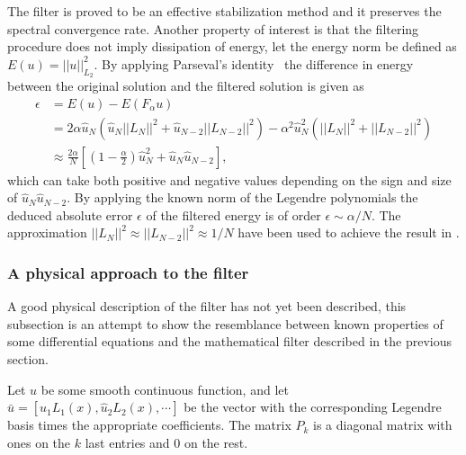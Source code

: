 The filter is proved to be an effective stabilization method and it preserves the 
spectral convergence rate. Another property of interest is that the filtering procedure 
does not imply dissipation of energy, let the energy norm be defined as $E(u) = ||u||_{L_2}^2$.  
By applying Parseval's identity~\cite{Young} the difference in energy between the original solution
and the filtered solution is given as 
\begin{align}
   \epsilon&=E(u) - E(F_{\alpha}u) \\
                &= 2\alpha\hat{u}_N(\hat{u}_N||L_N||^2+\hat{u}_{N-2}||L_{N-2}||^2)
    - \alpha^2\hat{u}^2_N(||L_N||^2+||L_{N-2}||^2)\\
    &\approx \frac{2\alpha}{N}\left[  (1-\frac{\alpha}{2})\hat{u}_N^2 + 
    \hat{u}_N\hat{u}_{N-2}\right],
    \label{eq:filterenergy}
\end{align}
which can take both positive and negative values depending on the sign and size of
$\hat{u}_N\hat{u}_{N-2}$. By applying the known norm of the Legendre polynomials 
the deduced absolute error $\epsilon$ of the filtered energy is of order 
$\epsilon\sim \alpha/N$. The approximation $||L_N||^2\approx||L_{N-2}||^2\approx 1/N$
have been used to achieve the result in .

\subsubsection{A physical approach to the filter}\label{physfilt}
A good physical description of the filter has not yet been described, this 
subsection is an attempt to show the resemblance between known properties 
of some differential equations and the mathematical filter described in the previous section.

Let $u$ be some smooth continuous function, and let $\bar u = [\hat u_1L_1(x),\hat u_2L_2(x), \cdots]$
be the vector with the corresponding Legendre basis times the appropriate coefficients. 
The matrix $P_{k}$ is a diagonal matrix with ones on the $k$ last entries and $0$ on the rest.

